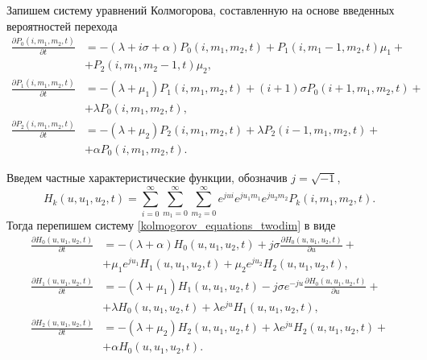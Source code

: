Запишем систему уравнений Колмогорова, составленную на основе введенных вероятностей перехода
\begin{equation} \label{kolmogorov_equations_twodim}
	\begin{split}
		\frac{{\partial P_{0}(i,m_{1},m_{2},t)}}{{\partial t}} &= -(\lambda + i\sigma + \alpha)P_{0}(i,m_{1},m_{2},t) + P_{1}(i,m_{1}-1,m_{2},t)\mu_{1} +\\  &+ P_{2}(i,m_{1},m_{2}-1,t)\mu_{2} ,
		\\
		\frac{{\partial P_{1}(i,m_{1},m_{2},t)}}{{\partial t}} &= -(\lambda + \mu_{1})P_{1}(i,m_{1},m_{2},t) + (i+1)\sigma P_{0}(i+1,m_{1},m_{2},t) +\\ &+ \lambda  P_{0}(i,m_{1},m_{2},t),
		\\
		\frac{{\partial P_{2}(i,m_{1},m_{2},t)}}{{\partial t}} &= -(\lambda + \mu_{2})P_{2}(i,m_{1},m_{2},t) + \lambda P_{2}(i-1,m_{1},m_{2},t)  +\\ &+ \alpha  P_{0}(i,m_{1},m_{2},t).
	\end{split}
\end{equation}	

Введем частные характеристические функции, обозначив $j=\sqrt{-1}$,
\begin{equation*}
	H_{k}(u,u_{1},u_{2},t) = \sum_{i=0}^{\infty}
	\sum_{m_{1}=0}^{\infty}
	\sum_{m_{2}=0}^{\infty}  
	e^{jui}e^{ju_{1}m_{1}}e^{ju_{2}m_{2}} P_{k}(i,m_{1},m_{2},t).
\end{equation*}
Тогда перепишем систему \eqref{kolmogorov_equations_twodim} в виде
\begin{equation} \label{characteristic_equations_twodim}
	\begin{split}
		\frac{{\partial H_{0}(u,u_{1},u_{2},t)}}{{\partial t}} &= -(\lambda + \alpha)H_{0}(u,u_{1},u_{2},t) + j\sigma
		\frac{{\partial H_{0}(u,u_{1},u_{2},t)}}{{\partial u}} +\\  &+ \mu_{1} e^{ju_{1}}H_{1}(u,u_{1},u_{2},t) + \mu_{2}e^{ju_{2}}H_{2}(u,u_{1},u_{2},t) ,
		\\
		\frac{{\partial H_{1}(u,u_{1},u_{2},t)}}{{\partial t}} &= -(\lambda + \mu_{1})H_{1}(u,u_{1},u_{2},t) - j\sigma e^{-ju}
		\frac{{\partial H_{0}(u,u_{1},u_{2},t)}}{{\partial u}} +\\  &+ \lambda H_{0}(u,u_{1},u_{2},t) + \lambda e^{ju}H_{1}(u,u_{1},u_{2},t) ,
		\\
		\frac{{\partial H_{2}(u,u_{1},u_{2},t)}}{{\partial t}} &= -(\lambda + \mu_{2})H_{2}(u,u_{1},u_{2},t)  + \lambda e^{ju}H_{2}(u,u_{1},u_{2},t) +\\  &+ \alpha H_{0}(u,u_{1},u_{2},t).
	\end{split}
\end{equation}  

